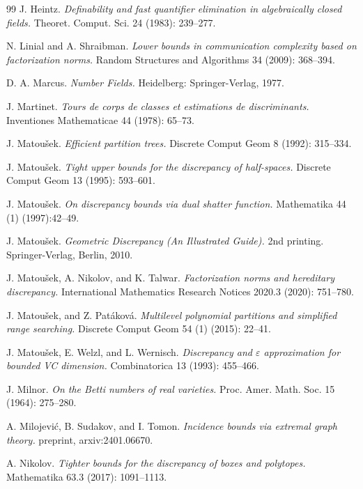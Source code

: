 \documentclass[11pt]{article}
\theoremstyle{plain}
\theoremstyle{definition}
\newcommand{\eps}{\varepsilon}
\begin{document}
\begin{thebibliography}{99}
        J. Heintz.
        \emph{Definability and fast quantifier elimination in algebraically closed fields.} Theoret. Comput. Sci. 24 (1983): 239--277.
		
		N. Linial and A. Shraibman. \emph{Lower bounds in communication complexity based on factorization norms.} Random Structures and Algorithms 34 (2009): 368--394.
		
		D. A. Marcus. \emph{Number Fields.}
		Heidelberg: Springer-Verlag, 1977.
		
		J. Martinet.
		\emph{Tours de corps de classes et estimations de discriminants.}
		Inventiones Mathematicae 44 (1978): 65--73.
		
		J. Matou\v{s}ek. 
		\emph{Efficient partition trees.}
		Discrete Comput Geom 8 (1992): 315--334.
		
		J. Matou\v{s}ek.
		\emph{Tight upper bounds for the discrepancy of half-spaces.}
		Discrete Comput Geom 13 (1995): 593--601.
		
		J. Matou\v{s}ek.
		\emph{On discrepancy bounds via dual shatter function.}
		Mathematika 44 (1) (1997):42--49.
		
		J. Matou\v{s}ek. \emph{Geometric Discrepancy (An Illustrated Guide).} 2nd
		printing. Springer-Verlag, Berlin, 2010.
		
		J. Matou\v{s}ek, A. Nikolov, and K. Talwar.
		\emph{Factorization norms and hereditary discrepancy.}
		International Mathematics Research Notices 2020.3 (2020): 751--780.
		
		J. Matou\v{s}ek, and Z. Pat\'akov\'a.
		\emph{Multilevel polynomial partitions and simplified range searching.}
		Discrete Comput Geom 54 (1) (2015): 22--41.
		
		J. Matou\v{s}ek, E. Welzl, and L. Wernisch.
		\emph{Discrepancy and $\eps$ approximation for bounded VC dimension.} Combinatorica 13 (1993): 455--466.

		J. Milnor.
		\emph{On the Betti numbers of real varieties.} Proc. Amer. Math. Soc. 15 (1964): 275--280.
        
		A. Milojevi\'c, B. Sudakov, and I. Tomon. \emph{Incidence bounds via extremal graph theory.}
		preprint, arxiv:2401.06670.
		
		A. Nikolov. 
		\emph{Tighter bounds for the discrepancy of boxes and polytopes.}
		Mathematika 63.3 (2017): 1091--1113.
		

\end{thebibliography}
\end{document}
